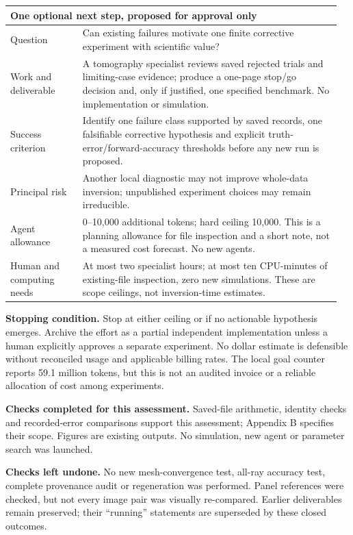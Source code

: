 \documentclass[10pt,letterpaper]{article}
\begin{document}
\begin{center}\small
\begin{tabular}{@{}p{0.21\linewidth}p{0.75\linewidth}@{}}\toprule
\multicolumn{2}{l}{One optional next step, proposed for approval only}\\\midrule
Question & Can existing failures motivate one finite corrective experiment with scientific value?\\[4pt]
Work and deliverable & A tomography specialist reviews saved rejected trials and limiting-case evidence; produce a one-page stop/go decision and, only if justified, one specified benchmark. No implementation or simulation.\\[4pt]
Success criterion & Identify one failure class supported by saved records, one falsifiable corrective hypothesis and explicit truth-error/forward-accuracy thresholds before any new run is proposed.\\[4pt]
Principal risk & Another local diagnostic may not improve whole-data inversion; unpublished experiment choices may remain irreducible.\\[4pt]
Agent allowance & 0--10,000 additional tokens; hard ceiling 10,000. This is a planning allowance for file inspection and a short note, not a measured cost forecast. No new agents.\\[4pt]
Human and computing needs & At most two specialist hours; at most ten CPU-minutes of existing-file inspection, zero new simulations. These are scope ceilings, not inversion-time estimates.\\\bottomrule
\end{tabular}\end{center}

\textbf{Stopping condition.}
Stop at either ceiling or if no actionable hypothesis emerges. Archive the effort as a partial independent implementation unless a human explicitly approves a separate experiment. No dollar estimate is defensible without reconciled usage and applicable billing rates. The local goal counter reports 59.1 million tokens, but this is not an audited invoice or a reliable allocation of cost among experiments.

\textbf{Checks completed for this assessment.}
Saved-file arithmetic, identity checks and recorded-error comparisons support this assessment; Appendix B specifies their scope. Figures are existing outputs. No simulation, new agent or parameter search was launched.

\textbf{Checks left undone.}
No new mesh-convergence test, all-ray accuracy test, complete provenance audit or regeneration was performed. Panel references were checked, but not every image pair was visually re-compared. Earlier deliverables remain preserved; their ``running'' statements are superseded by these closed outcomes.
\end{document}
